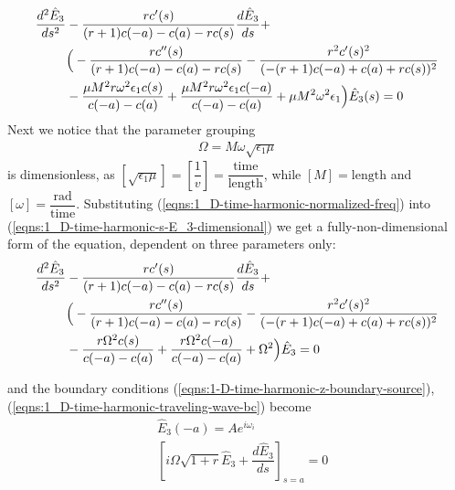 \documentclass[12pt,twoside]{article}
\begin{document}
\begin{align}
\label{eqns:1_D-time-harmonic-s-E_3-dimensional}
\dfrac{d^2\hat{E}_3}{ds^2}&-\dfrac{r c'(s) }{(r+1) c(-a)-c(a)-r c(s)}\dfrac{d\hat{E}_3}{ds}+ \notag\\
&\Big(-\dfrac{r c''(s)}{(r+1) c(-a)-c(a)-r
   c(s)}-\dfrac{r^2 c'(s)^2}{(-(r+1) c(-a)+c(a)+r c(s))^2} \notag \\
   &-\dfrac{\mu  M^2 r \omega ^2
   \epsilon_1 c(s)}{c(-a)-c(a)}+\dfrac{\mu  M^2 r \omega ^2 \epsilon_1
   c(-a)}{c(-a)-c(a)}+\mu  M^2 \omega ^2 \epsilon_1\Big)\hat{E}_3(s)=0
\end{align}
Next we notice that the parameter grouping  
\begin{align}
\label{eqns:1_D-time-harmonic-normalized-freq}
\Omega = M \omega \sqrt{\epsilon_1 \mu}
\end{align}
is dimensionless, as $[\sqrt{\epsilon_1 \mu}] = \left[ \dfrac{1}{v}\right] = \dfrac{\text{time}}{\text{length}}$, while $[M] = \text{length}$ and $[\omega] = \dfrac{\text{rad}}{\text{time}}$. 
Substituting (\ref{eqns:1_D-time-harmonic-normalized-freq}) into (\ref{eqns:1_D-time-harmonic-s-E_3-dimensional}) we get a fully-non-dimensional form of the equation, dependent on three parameters only:
\begin{align}
\label{eqns:1_D-time-harmonic-s-E_3-non-dim}
\dfrac{d^2\hat{E}_3}{ds^2}&-\dfrac{r c'(s) }{(r+1) c(-a)-c(a)-r c(s)}\dfrac{d\hat{E}_3}{ds}+ \notag\\ 
&\Big(-\dfrac{r c''(s)}{(r+1) c(-a)-c(a)-r
   c(s)}-\dfrac{r^2 c'(s)^2}{(-(r+1) c(-a)+c(a)+r c(s))^2} \notag \\
   &-\dfrac{r \Omega ^2
   c(s)}{c(-a)-c(a)}+\dfrac{r \Omega ^2 c(-a)}{c(-a)-c(a)}+\Omega ^2\Big)\hat{E}_3=0
\end{align}

and the boundary conditions (\ref{eqns:1-D-time-harmonic-z-boundary-source}),
 (\ref{eqns:1_D-time-harmonic-traveling-wave-bc}) become
\begin{subequations}
\begin{align}
\label{eqns:1-D-time-harmonic-z-boundary-source-normalized}
&\hat{E}_3(-a) = Ae^{i \omega_i} \\
\label{eqns:1_D-time-harmonic-traveling-wave-bc-normalized}
&\left[ i \Omega \sqrt{1+r} \hat{E}_3 +  \dfrac{d \hat{E}_3}{d s} \right]_{s = a}=0
\end{align}
\end{subequations}
\end{document}
